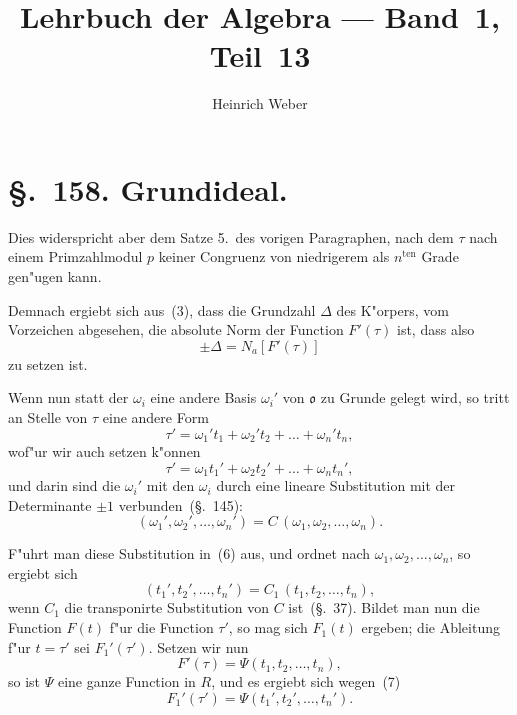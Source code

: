 \documentclass[12pt,a4paper]{article}
\title{Lehrbuch der Algebra --- Band~1, Teil~13}
\author{Heinrich Weber}
\date{}
\theoremstyle{weber}
\begin{document}
\maketitle
\thispagestyle{empty}

\setcounter{section}{157}

\section*{\S.~158. Grundideal.}

Dies widerspricht aber dem Satze 5.\ des vorigen Paragraphen,
nach dem $\tau$ nach einem Primzahlmodul $p$ keiner Congruenz von
niedrigerem als $n^{\mathrm{ten}}$ Grade gen"ugen kann.

Demnach ergiebt sich aus~(3), dass die Grundzahl $\varDelta$ des
K"orpers, vom Vorzeichen abgesehen, die absolute Norm
der Function $F'(\tau)$ ist, dass also
\begin{equation}\label{eq:5}
\pm\varDelta = N_a[F'(\tau)]
\end{equation}
zu setzen ist.

Wenn nun statt der $\omega_i$ eine andere Basis $\omega_i'$ von $\mathfrak{o}$ zu Grunde
gelegt wird, so tritt an Stelle von $\tau$ eine andere Form
\begin{equation}\label{eq:6}
\tau' = \omega_1't_1 + \omega_2't_2 + \dots + \omega_n't_n,
\end{equation}
wof"ur wir auch setzen k"onnen
\begin{equation}\label{eq:7}
\tau' = \omega_1t_1' + \omega_2t_2' + \dots + \omega_nt_n',
\end{equation}
und darin sind die $\omega_i'$ mit den $\omega_i$ durch eine lineare Substitution
mit der Determinante $\pm 1$ verbunden~(\S.~145):
\begin{equation}\label{eq:8}
(\omega_1', \omega_2', \dots, \omega_n') = C\,(\omega_1, \omega_2, \dots, \omega_n).
\end{equation}

F"uhrt man diese Substitution in~(6) aus, und ordnet nach
$\omega_1, \omega_2, \dots, \omega_n$, so ergiebt sich
\begin{equation}\label{eq:9}
(t_1', t_2', \dots, t_n') = C_1\,(t_1, t_2, \dots, t_n),
\end{equation}
wenn $C_1$ die transponirte Substitution von $C$ ist~(\S.~37). Bildet
man nun die Function $F(t)$ f"ur die Function $\tau'$, so mag sich $F_1(t)$
ergeben; die Ableitung f"ur $t = \tau'$ sei $F_1'(\tau')$. Setzen wir nun
\[
F'(\tau) = \varPsi(t_1, t_2, \dots, t_n),
\]
so ist $\varPsi$ eine ganze Function in $R$, und es ergiebt sich wegen~(7)
\[
F_1'(\tau') = \varPsi(t_1', t_2', \dots, t_n').
\]
\end{document}
